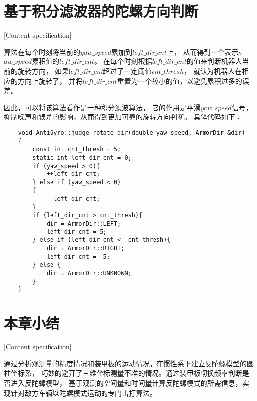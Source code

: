 \section{基于积分滤波器的陀螺方向判断}[Content specification]

算法在每个时刻将当前的$yaw\_speed$累加到$left\_dir\_cnt$上，
从而得到一个表示y$aw\_speed$累积值的$left\_dir\_cnt$。
在每个时刻根据$left\_dir\_cnt$的值来判断机器人当前的旋转方向，
如果l$eft\_dir\_cnt$超过了一定阈值$cnt\_thresh$，
就认为机器人在相应的方向上旋转了，
并将$left\_dir\_cnt$重置为一个较小的值，以避免累积过多的误差。

因此，可以将该算法看作是一种积分滤波算法，
它的作用是平滑$yaw\_speed$信号，抑制噪声和误差的影响，从而得到更加可靠的旋转方向判断。
具体代码如下：

\begin{lstlisting}
    void AntiGyro::judge_rotate_dir(double yaw_speed, ArmorDir &dir)
    {
        const int cnt_thresh = 5;
        static int left_dir_cnt = 0;
        if (yaw_speed > 0){
            ++left_dir_cnt;
        } else if (yaw_speed < 0)
        {
            --left_dir_cnt;
        } 
        if (left_dir_cnt > cnt_thresh){
            dir = ArmorDir::LEFT;
            left_dir_cnt = 5;
        } else if (left_dir_cnt < -cnt_thresh){    
            dir = ArmorDir::RIGHT;
            left_dir_cnt = -5;
        } else {
            dir = ArmorDir::UNKNOWN;
        }
    }
\end{lstlisting}


\section{本章小结}[Content specification]

通过分析观测量的精度情况和装甲板的运动情况，在惯性系下建立反陀螺模型的圆柱坐标系，
巧妙的避开了三维坐标测量不准的情况。通过装甲板切换频率判断是否进入反陀螺模型，
基于观测的空间量和时间量计算反陀螺模式的所需信息，实现针对敌方车辆以陀螺模式运动的专门击打算法。
